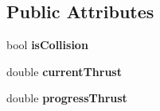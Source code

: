 \subsection*{Public Attributes}
\begin{DoxyCompactItemize}
\item 
\mbox{\label{classNavAP_aa7a5eb81334c844334e120c12925b11c}} 
bool {\bfseries is\+Collision}
\item 
\mbox{\label{classNavAP_aa4392b4d1052738eb39d5ebda4fb9da8}} 
double {\bfseries current\+Thrust}
\item 
\mbox{\label{classNavAP_a1c27aa97a6763a46523e5e7c38b911b2}} 
double {\bfseries progress\+Thrust}
\end{DoxyCompactItemize}
